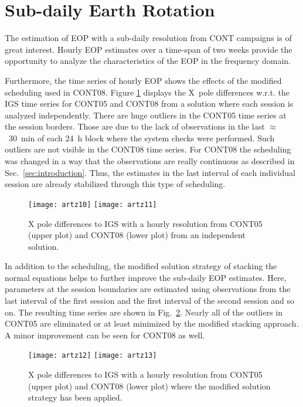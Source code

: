 \documentclass[natbib,twocolumn,twoside]{svmultiag}
\begin{document}
\section{Sub-daily Earth Rotation}
The estimation of EOP with a sub-daily resolution from CONT campaigns is of
great interest.
Hourly EOP estimates over a time-span of two weeks provide the opportunity
to analyze the characteristics of the EOP in the frequency domain.

Furthermore, the time series of hourly EOP shows the effects of the modified
scheduling used in CONT08.
Figure \ref{fig:xpole} displays the X~pole differences w.r.t. the IGS time
series for CONT05 and CONT08 from a solution where each session is analyzed
independently.
There are huge outliers in the CONT05 time series at the session borders.
Those are due to the lack of observations in the last $\approx$~30~min of
each 24~h block where the system checks were performed.
Such outliers are not visible in the CONT08 time series.
For CONT08 the scheduling was changed in a way that the observations are
really continuous as described in Sec.~\ref{sec:introduction}.
Thus, the estimates in the last interval of each individual session are
already stabilized through this type of scheduling.
\begin{figure}[t]
 \centering
 \texttt{[image: artz10]}
 \texttt{[image: artz11]}
 \caption{X pole differences to IGS with a hourly resolution from CONT05 
          (upper plot) and CONT08 (lower plot) from an independent solution.}
 \label{fig:xpole}
\end{figure}

In addition to the scheduling, the modified solution strategy of stacking the
normal equations helps to further improve the sub-daily EOP estimates.
Here, parameters at the session boundaries are estimated using observations
from the last interval of the first session and the first interval of the
second session and so on.
The resulting time series are shown in Fig.~\ref{fig:stack}.
Nearly all of the outliers in CONT05 are eliminated or at least minimized
by the modified stacking approach.
A minor improvement can be seen for CONT08 as well.
\begin{figure}[t]
 \centering
 \texttt{[image: artz12]}
 \texttt{[image: artz13]}
 \caption{X pole differences to IGS with a hourly resolution from CONT05 
          (upper plot) and CONT08 (lower plot) where the modified
          solution strategy has been applied.}
 \label{fig:stack}
\end{figure}
\end{document}
